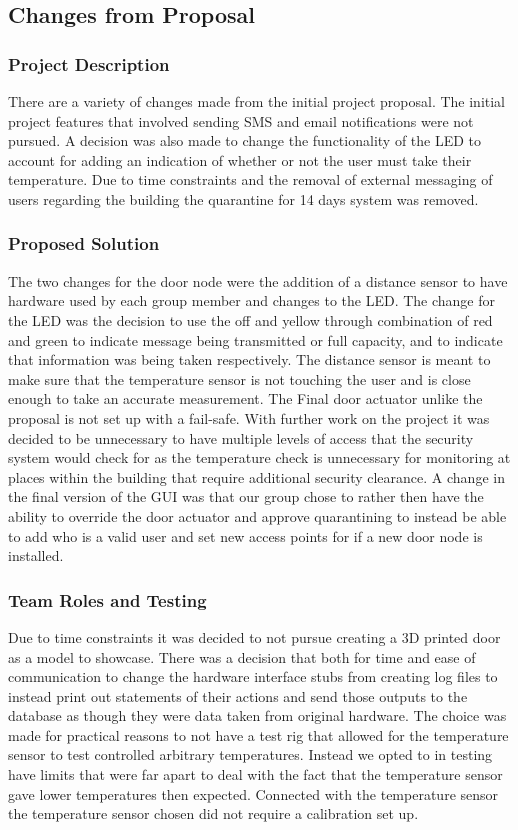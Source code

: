 \subsection{Changes from Proposal}
\subsubsection{Project Description}
There are a variety of changes made from the initial project proposal. The initial project features that involved sending SMS and email notifications were not pursued. A decision was also made to change the functionality of the LED to account for adding an indication of whether or not the user must take their temperature. Due to time constraints and the removal of external messaging of users regarding the building the quarantine for 14 days system was removed.
\subsubsection{Proposed Solution}
The two changes for the door node were the addition of a distance sensor to have hardware used by each group member and changes to the LED. The change for the LED was the decision to use the off and yellow through combination of red and green to indicate message being transmitted or full capacity, and to indicate that information was being taken respectively. The distance sensor is meant to make sure that the temperature sensor is not touching the user and is close enough to take an accurate measurement. The Final door actuator unlike the proposal is not set up with a fail-safe. With further work on the project it was decided to be unnecessary to have multiple levels of access that the security system would check for as the temperature check is unnecessary for monitoring at places within the building that require additional security clearance. A change in the final version of the GUI was that our group chose to rather then have the ability to override the door actuator and approve quarantining to instead be able to add who is a valid user and set new access points for if a new door node is installed.
\subsubsection{Team Roles and Testing}
 Due to time constraints it was decided to not pursue creating a 3D printed door as a model to showcase. There was a decision that both for time and ease of communication to change the hardware interface stubs from creating log files to instead print out statements of their actions and send those outputs to the database as though they were data taken from original hardware. The choice was made for practical reasons to not have a test rig that allowed for the temperature sensor to test controlled arbitrary temperatures. Instead we opted to in testing have limits that were far apart to deal with the fact that the temperature sensor gave lower temperatures then expected. Connected with the temperature sensor the temperature sensor chosen did not require a calibration set up.
